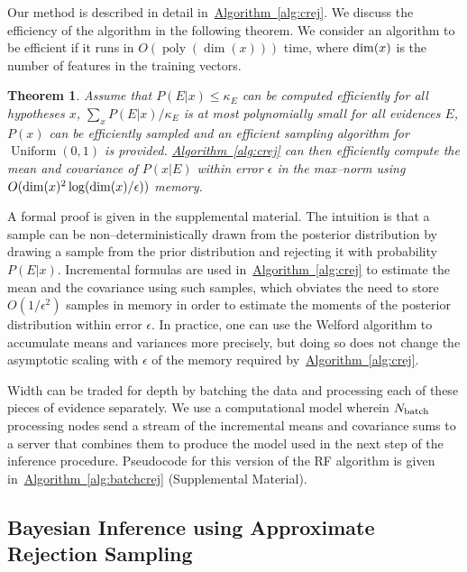 \documentclass[twoside]{article}
\newtheorem{theorem}{Theorem}
\newcommand{\alg}[1]{\hyperref[alg:#1]{Algorithm~\ref*{alg:#1}}}
\begin{document}
Our method is described in detail in~\alg{crej}. We discuss the efficiency of the algorithm in the following theorem.
We consider an algorithm to be efficient if it runs in $O(\operatorname{poly}(\operatorname{dim}(x)))$ time, where ${\rm dim}(x)$ is the number of features in the training vectors.

\begin{theorem}
Assume that $P(E|x)\le \kappa_E$ can be computed efficiently for all hypotheses $x$, $\sum_x P(E|x)/\kappa_E$ is at most polynomially small for all
evidences $E$, $P(x)$ can be efficiently sampled and an efficient sampling algorithm for $\operatorname{Uniform}(0,1)$ is provided.  \alg{crej} 
can then efficiently compute the mean and covariance of $P(x|E)$ within error $\epsilon$ in the max--norm using $O({\rm dim}(x)^2\log({\rm dim}(x)/\epsilon))$ memory.\label{thm:crej}
\end{theorem}
A formal proof is given in the supplemental material.  The intuition is that a sample can be non--deterministically drawn from
the posterior distribution by drawing a
sample from the prior distribution and rejecting it with probability $P(E|x)$.  Incremental formulas are
used in~\alg{crej} to estimate the mean and the covariance using such samples, which obviates the need
to store $O(1/\epsilon^2)$ samples in memory in order to estimate the moments of the posterior distribution within error $\epsilon$.
In practice, one can use the Welford algorithm \cite{welford_note_1962} to  accumulate means
and variances more precisely, but doing so does not change the asymptotic scaling with $\epsilon$ of the memory required by~\alg{crej}.

Width can be traded for depth by batching the data and processing each of
these pieces of evidence separately. 
We use a computational model wherein $N_{\rm batch}$ processing
nodes send a stream of the incremental means and
covariance sums to a server that combines them to produce the
model used in the next step of the inference procedure.
Pseudocode for this version of the
RF algorithm is given in~\alg{batchcrej} (Supplemental Material).

\subsection{Bayesian Inference using Approximate Rejection Sampling}
\label{sec:approx-rej}
\end{document}
